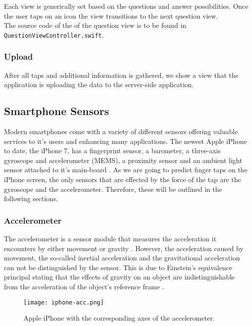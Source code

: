Each view is generically set based on the questions and answer possibilities. Once the user taps on an icon the view transitions to the next question view.\\ 

The source code of the of the question view is to be found in \texttt{QuestionViewController.swift}.

\subsubsection{Upload}
After all taps and additional information is gathered, we show a view that the application is uploading the data to the server-side application. 

\subsection{Smartphone Sensors}
Modern smartphones come with a variety of different sensors offering valuable services to it's users and enhancing many applications. The newest Apple iPhone to date, the iPhone 7, has a fingerprint sensor, a barometer, a three-axis gyroscope and accelerometer (MEMS), a proximity sensor and an ambient light sensor attached to it's main-board \cite{iphone7techspecs}. As we are going to predict finger taps on the iPhone screen, the only sensors that are effected by the force of the tap are the gyroscope and the accelerometer. Therefore, these will be outlined in the following sections.

\subsubsection{Accelerometer}

The accelerometer is a sensor module that measures the acceleration it encounters by either movement or gravity \cite{sensorsstudy}. However, the acceleration caused by movement, the so-called inertial acceleration and the gravitational acceleration can not be distinguished by the sensor. This is due to Einstein's equivalence principal stating that the effects of gravity on an object are indistinguishable from the acceleration of the object's reference frame \cite{doi:10.1021/ed014p49.2}. \\

\begin{figure}[h!]
  \centering
  \texttt{[image: iphone-acc.png]}
  \caption{Apple iPhone with the corresponding axes of the accelerometer.}
\end{figure}

